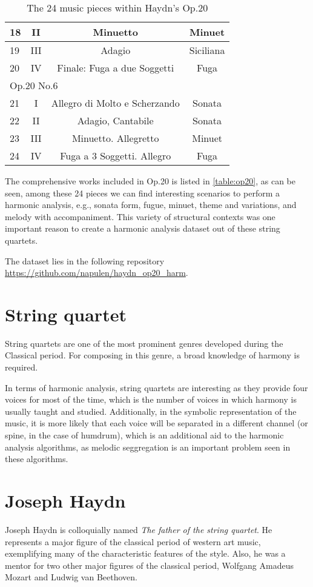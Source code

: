 \begin{table}[tbp]
\begin{tabular}{|l|c|c|c|}
18 & II & Minuetto & Minuet \\ \hline
19 & III & Adagio & Siciliana \\ \hline
20 & IV & Finale: Fuga a due Soggetti & Fuga \\ \hline
\multicolumn{4}{|l|}{Op.20 No.6} \\ \hline
21 & I & Allegro di Molto e Scherzando & Sonata \\ \hline
22 & II & Adagio, Cantabile & Sonata \\ \hline
23 & III & Minuetto. Allegretto & Minuet \\ \hline
24 & IV & Fuga a 3 Soggetti. Allegro & Fuga \\ \hline
\end{tabular}
\caption{The 24 music pieces within Haydn's Op.20}
\label{table:op20}
\end{table}

The comprehensive works included in Op.20 is listed in \autoref{table:op20}, as can be seen, among these 24 pieces we can find interesting scenarios to perform a harmonic analysis, e.g., sonata form, fugue, minuet, theme and variations, and melody with accompaniment. This variety of structural contexts was one important reason to create a harmonic analysis dataset out of these string quartets.

The dataset lies in the following repository \url{https://github.com/napulen/haydn_op20_harm}.

\section{String quartet}
String quartets are one of the most prominent genres developed during the Classical period. For composing in this genre, a broad knowledge of harmony is required.

In terms of harmonic analysis, string quartets are interesting as they provide four voices for most of the time, which is the number of voices in which harmony is usually taught and studied. Additionally, in the symbolic representation of the music, it is more likely that each voice will be separated in a different channel (or spine, in the case of humdrum), which is an additional aid to the harmonic analysis algorithms, as melodic seggregation is an important problem seen in these algorithms.

\section{Joseph Haydn}
Joseph Haydn is colloquially named \emph{The father of the string quartet}. He represents a major figure of the classical period of western art music,
exemplifying many of the characteristic features of the style. Also, he was a mentor for two other major figures of the classical period, Wolfgang Amadeus Mozart and Ludwig van Beethoven.

